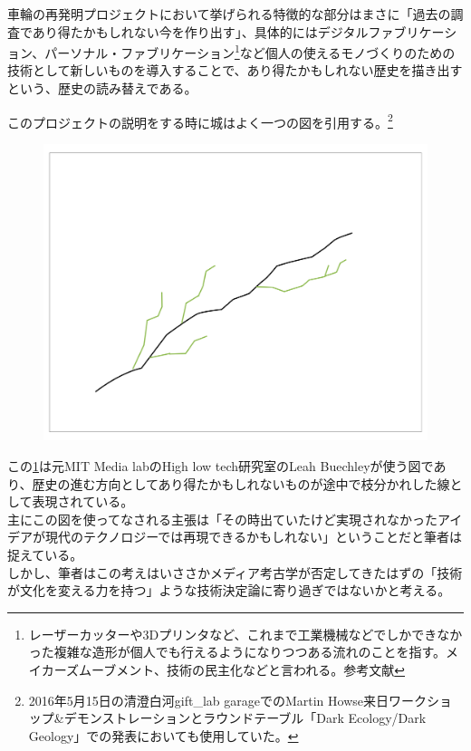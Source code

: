 \documentclass[a4paper,report]{jsbook}
\begin{document}
車輪の再発明プロジェクトにおいて挙げられる特徴的な部分はまさに「過去の調査であり得たかもしれない今を作り出す」、具体的にはデジタルファブリケーション、パーソナル・ファブリケーション\footnote{レーザーカッターや3Dプリンタなど、これまで工業機械などでしかできなかった複雑な造形が個人でも行えるようになりつつある流れのことを指す。メイカーズムーブメント、技術の民主化などと言われる。参考文献\autocite{fab:tanaka}}など個人の使えるモノづくりのための技術として新しいものを導入することで、あり得たかもしれない歴史を描き出すという、歴史の読み替えである。

このプロジェクトの説明をする時に城はよく一つの図を引用する。\footnote{2016年5月15日の清澄白河gift\_lab
  garageでのMartin
  Howse来日ワークショップ\&デモンストレーションとラウンドテーブル「Dark
  Ecology/Dark Geology」での発表においても使用していた。}\\
\autocite{soundstudies3}

\begin{figure}[htbp]
\centering
\includegraphics[width=1.00000\textwidth]{./img/leah_sideway.jpg}
\caption{\label{fig:leah}}
\end{figure}

\autocite{leah:slide}

この\cref{fig:leah}は元MIT Media labのHigh low
tech研究室のLeah
Buechleyが使う図であり、歴史の進む方向としてあり得たかもしれないものが途中で枝分かれした線として表現されている。\\
主にこの図を使ってなされる主張は「その時出ていたけど実現されなかったアイデアが現代のテクノロジーでは再現できるかもしれない」ということだと筆者は捉えている。\\
しかし、筆者はこの考えはいささかメディア考古学が否定してきたはずの「技術が文化を変える力を持つ」ような技術決定論に寄り過ぎではないかと考える。
\end{document}
